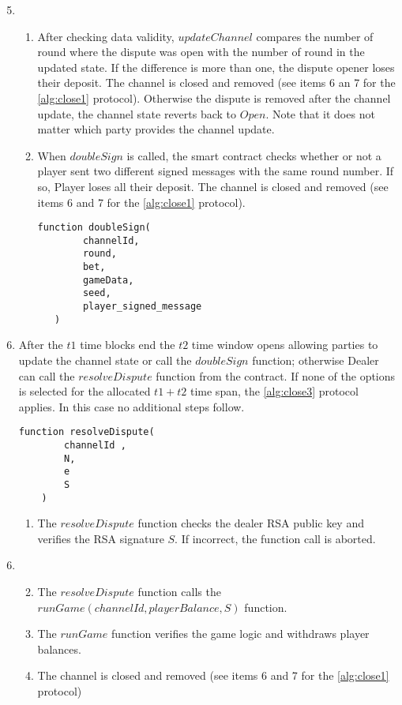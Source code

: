\begin{algorithm}
\begin{enumerate}
	\setcounter{enumi}{4}
\item[]
\begin{enumerate}
	\item After checking data validity, $updateChannel$ compares the number of round where the dispute was open with the number of round in the updated state. If the difference is more than one, the dispute opener loses their deposit.  The channel is closed and removed (see items 6 an 7 for the \autoref{alg:close1} protocol). Otherwise the dispute is removed after the channel update, the channel state reverts back to $Open$. Note that it does not matter which party provides the channel update. \label{upd}
	\item When $doubleSign$ is called, the smart contract checks whether or not a player sent two different signed messages with the same round number. If so, Player loses all their deposit. The channel is closed and removed (see items 6 and 7 for the  \autoref{alg:close1} protocol). \label{dbl}
\begin{lstlisting}
function doubleSign(
        channelId,
        round,
        bet,
        gameData,
        seed,
        player_signed_message
   )
\end{lstlisting}
\end{enumerate}
	\item After the $t1$ time blocks end the $t2$ time window opens allowing parties to update the channel state or call the  $doubleSign$ function; otherwise Dealer can call the $resolveDispute$ function from the contract. If none of the options is selected for the allocated $t1+t2$ time span, the \autoref{alg:close3} protocol applies. In this case no additional steps follow. \label{block}
\begin{lstlisting}
function resolveDispute(
        channelId ,
        N,
        e
        S
    )
\end{lstlisting}
\begin{enumerate}
	\item  The $resolveDispute$ function checks the dealer RSA public key and verifies the RSA signature $S$. If incorrect, the function call is aborted.
\end{enumerate}
\end{enumerate}
\end{algorithm}
\begin{algorithm}
\begin{enumerate}
	\setcounter{enumi}{5}
\item[]
\begin{enumerate}
\setcounter{enumii}{1}
	\item The $resolveDispute$ function calls the $runGame(channelId , playerBalance, S)$ function.
	 \item The $runGame$ function verifies the game logic and withdraws player balances.
	\item  The channel is closed and removed (see items 6 and 7 for the \autoref{alg:close1} protocol)
\end{enumerate}
\end{enumerate}
\end{algorithm}

